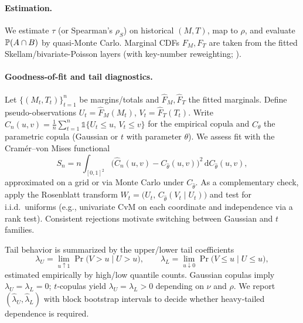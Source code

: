 \paragraph{Estimation.} We estimate $\tau$ (or Spearman’s $\rho_S$) on historical $(M,T)$, map to $\rho$, and evaluate $\mathbb{P}(A\cap B)$ by quasi-Monte Carlo. Marginal CDFs $F_M,F_T$ are taken from the fitted Skellam/bivariate-Poisson layers (with key-number reweighting; ).

\paragraph{Goodness-of-fit and tail diagnostics.}\label{subsec:copula-gof}
Let $\{(M_t,T_t)\}_{t=1}^n$ be margins/totals and $\hat F_M,\hat F_T$ the fitted marginals. Define pseudo-observations $U_t=\hat F_M(M_t)$, $V_t=\hat F_T(T_t)$. Write $\hat C_n(u,v)=\tfrac1n\sum_{t=1}^n \mathbb{1}\{U_t\le u,\,V_t\le v\}$ for the empirical copula and $C_\theta$ the parametric copula (Gaussian or $t$ with parameter $\theta$).
We assess fit with the Cramér–von Mises functional
\[
S_n= n\int_{[0,1]^2}\big(\hat C_n(u,v)-C_{\hat\theta}(u,v)\big)^2\,\mathrm d C_{\hat\theta}(u,v),
\]
approximated on a grid or via Monte Carlo under $C_{\hat\theta}$. As a complementary check, apply the Rosenblatt transform $W_t=\big(U_t,\, C_{\hat\theta}(V_t\mid U_t)\big)$ and test for i.i.d.\ uniforms (e.g., univariate CvM on each coordinate and independence via a rank test). Consistent rejections motivate switching between Gaussian and $t$ families.

Tail behavior is summarized by the upper/lower tail coefficients
\[
\lambda_U=\lim_{u\uparrow 1}\Pr\big(V>u\mid U>u\big),\qquad
\lambda_L=\lim_{u\downarrow 0}\Pr\big(V\le u\mid U\le u\big),
\]
estimated empirically by high/low quantile counts. Gaussian copulas imply $\lambda_U=\lambda_L=0$; $t$‑copulas yield $\lambda_U=\lambda_L>0$ depending on $\nu$ and $\rho$. We report $(\hat\lambda_U,\hat\lambda_L)$ with block bootstrap intervals to decide whether heavy‑tailed dependence is required.

